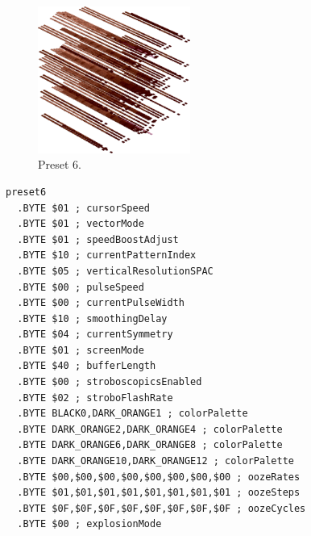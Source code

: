 \clearpage
\begin{minipage}[b]{0.48\linewidth}
\begin{figure}[H]                                                          
  \centering                                                             
  \begin{adjustbox}{width=5cm,center}                                   
  \includegraphics[width=5cm]{src/colorspace_presets/preset6-45.png}%
  \end{adjustbox}                                                        
\caption*{Preset 6.}                                           
\end{figure}                                                               
\end{minipage}
\hspace{0.1cm}
\begin{minipage}[b]{0.48\linewidth}                            
\begin{lstlisting}[basicstyle=\ttfamily\tiny]
preset6
  .BYTE $01 ; cursorSpeed
  .BYTE $01 ; vectorMode
  .BYTE $01 ; speedBoostAdjust
  .BYTE $10 ; currentPatternIndex
  .BYTE $05 ; verticalResolutionSPAC
  .BYTE $00 ; pulseSpeed
  .BYTE $00 ; currentPulseWidth
  .BYTE $10 ; smoothingDelay
  .BYTE $04 ; currentSymmetry
  .BYTE $01 ; screenMode
  .BYTE $40 ; bufferLength
  .BYTE $00 ; stroboscopicsEnabled
  .BYTE $02 ; stroboFlashRate
  .BYTE BLACK0,DARK_ORANGE1 ; colorPalette
  .BYTE DARK_ORANGE2,DARK_ORANGE4 ; colorPalette
  .BYTE DARK_ORANGE6,DARK_ORANGE8 ; colorPalette
  .BYTE DARK_ORANGE10,DARK_ORANGE12 ; colorPalette
  .BYTE $00,$00,$00,$00,$00,$00,$00,$00 ; oozeRates
  .BYTE $01,$01,$01,$01,$01,$01,$01,$01 ; oozeSteps
  .BYTE $0F,$0F,$0F,$0F,$0F,$0F,$0F,$0F ; oozeCycles
  .BYTE $00 ; explosionMode
\end{lstlisting}
\end{minipage}

\vspace*{-0.5cm}

